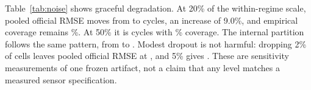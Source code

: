 Table~\ref{tab:noise} shows graceful degradation. At 20\% of the within-regime
scale, pooled official RMSE moves from \CurrentNoiseOfficialZero{} to
\CurrentNoiseOfficialTwenty{} cycles, an increase of 9.0\%, and empirical coverage
remains \CurrentNoiseCoverageTwenty{}\%. At 50\% it is
\CurrentNoiseOfficialFifty{} cycles with \CurrentNoiseCoverageFifty{}\% coverage.
The internal partition follows the same pattern, from \CurrentNoiseHeldoutZero{}
to \CurrentNoiseHeldoutFifty{}. Modest dropout is not harmful: dropping 2\% of
cells leaves pooled official RMSE at \CurrentNoiseDropoutTwo{}, and 5\% gives
\CurrentNoiseDropoutFive{}. These are sensitivity measurements of one frozen
artifact, not a claim that any level matches a measured sensor specification.
